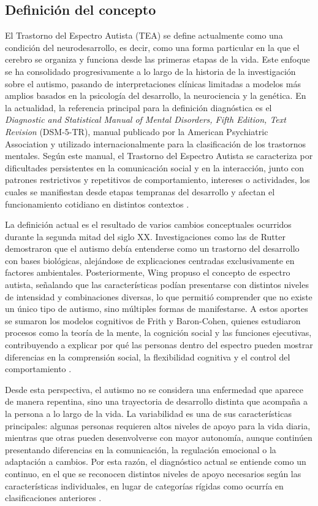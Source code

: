 \documentclass{book}
\begin{document}
\subsection{Definición del concepto}

El Trastorno del Espectro Autista (TEA) se define actualmente como una condición del neurodesarrollo, es decir, como una forma particular en la que el cerebro se organiza y funciona desde las primeras etapas de la vida. Este enfoque se ha consolidado progresivamente a lo largo de la historia de la investigación sobre el autismo, pasando de interpretaciones clínicas limitadas a modelos más amplios basados en la psicología del desarrollo, la neurociencia y la genética. En la actualidad, la referencia principal para la definición diagnóstica es el \textit{Diagnostic and Statistical Manual of Mental Disorders, Fifth Edition, Text Revision} (DSM-5-TR), manual publicado por la American Psychiatric Association y utilizado internacionalmente para la clasificación de los trastornos mentales. Según este manual, el Trastorno del Espectro Autista se caracteriza por dificultades persistentes en la comunicación social y en la interacción, junto con patrones restrictivos y repetitivos de comportamiento, intereses o actividades, los cuales se manifiestan desde etapas tempranas del desarrollo y afectan el funcionamiento cotidiano en distintos contextos \cite{APA2022, Lord2018, Hirota2023}.

La definición actual es el resultado de varios cambios conceptuales ocurridos durante la segunda mitad del siglo XX. Investigaciones como las de Rutter demostraron que el autismo debía entenderse como un trastorno del desarrollo con bases biológicas, alejándose de explicaciones centradas exclusivamente en factores ambientales. Posteriormente, Wing propuso el concepto de espectro autista, señalando que las características podían presentarse con distintos niveles de intensidad y combinaciones diversas, lo que permitió comprender que no existe un único tipo de autismo, sino múltiples formas de manifestarse. A estos aportes se sumaron los modelos cognitivos de Frith y Baron-Cohen, quienes estudiaron procesos como la teoría de la mente, la cognición social y las funciones ejecutivas, contribuyendo a explicar por qué las personas dentro del espectro pueden mostrar diferencias en la comprensión social, la flexibilidad cognitiva y el control del comportamiento \cite{Wing1997, Frith2003, BaronCohen2000, Hill2004}.

Desde esta perspectiva, el autismo no se considera una enfermedad que aparece de manera repentina, sino una trayectoria de desarrollo distinta que acompaña a la persona a lo largo de la vida. La variabilidad es una de sus características principales: algunas personas requieren altos niveles de apoyo para la vida diaria, mientras que otras pueden desenvolverse con mayor autonomía, aunque continúen presentando diferencias en la comunicación, la regulación emocional o la adaptación a cambios. Por esta razón, el diagnóstico actual se entiende como un continuo, en el que se reconocen distintos niveles de apoyo necesarios según las características individuales, en lugar de categorías rígidas como ocurría en clasificaciones anteriores \cite{APA2022, Happe2020, Lord2018}.
\end{document}
